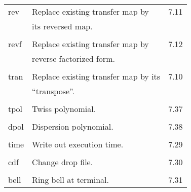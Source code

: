 \begin{center}
\begin{tabular}{lll}
\hspace{1.5em}rev   &        Replace existing transfer map by      & \hspace{2em}7.11\\
                    & its reversed map.                            &\\
\vspace{-3mm}& &\\
\hspace{1.5em}revf  &         Replace existing transfer map by     & \hspace{2em}7.12\\
                    & reverse factorized form.                     &\\
\vspace{-3mm}& &\\
\hspace{1.5em}tran  & Replace existing transfer map by its         & \hspace{2em}7.10\\
                    & ``transpose''.                               &\\
\vspace{-3mm}& &\\
\hspace{1.5em}tpol  &         Twiss polynomial.                    & \hspace{2em}7.37\\
\vspace{-3mm}& &\\
\hspace{1.5em}dpol  &         Dispersion polynomial.               & \hspace{2em}7.38\\
\vspace{-3mm}& &\\
\hspace{1.5em}time  &         Write out execution time.            & \hspace{2em}7.29\\
\vspace{-3mm}& &\\
\hspace{1.5em}cdf   &        Change drop file.                     & \hspace{2em}7.30\\
\vspace{-3mm}& &\\
\hspace{1.5em}bell  &         Ring bell at terminal.               & \hspace{2em}7.31\\

\end{tabular}
\end{center}
